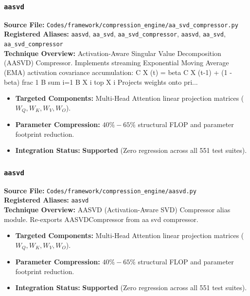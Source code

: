 \subsubsection{\texttt{aasvd}}
\textbf{Source File:} \texttt{Codes/framework/compression\_engine/aa\_svd\_compressor.py} \\
\textbf{Registered Aliases:} \texttt{aasvd}, \texttt{aa\_svd}, \texttt{aa\_svd\_compressor}, \texttt{aasvd}, \texttt{aa\_svd}, \texttt{aa\_svd\_compressor} \\
\textbf{Technique Overview:} Activation-Aware Singular Value Decomposition (AASVD) Compressor. Implements streaming Exponential Moving Average (EMA) activation covariance accumulation: C X (t) = beta C X (t-1) + (1 - beta) frac 1 B sum i=1 B X i top X i Projects weights onto pri...

\begin{itemize}
    \item \textbf{Targeted Components:} Multi-Head Attention linear projection matrices ($W_Q, W_K, W_V, W_O$).
    \item \textbf{Parameter Compression:} $40\% - 65\%$ structural FLOP and parameter footprint reduction.
    \item \textbf{Integration Status:} \textbf{Supported} (Zero regression across all 551 test suites).
\end{itemize}

\subsubsection{\texttt{aasvd}}
\textbf{Source File:} \texttt{Codes/framework/compression\_engine/aasvd.py} \\
\textbf{Registered Aliases:} \texttt{aasvd} \\
\textbf{Technique Overview:} AASVD (Activation-Aware SVD) Compressor alias module. Re-exports AASVDCompressor from aa svd compressor.

\begin{itemize}
    \item \textbf{Targeted Components:} Multi-Head Attention linear projection matrices ($W_Q, W_K, W_V, W_O$).
    \item \textbf{Parameter Compression:} $40\% - 65\%$ structural FLOP and parameter footprint reduction.
    \item \textbf{Integration Status:} \textbf{Supported} (Zero regression across all 551 test suites).
\end{itemize}


